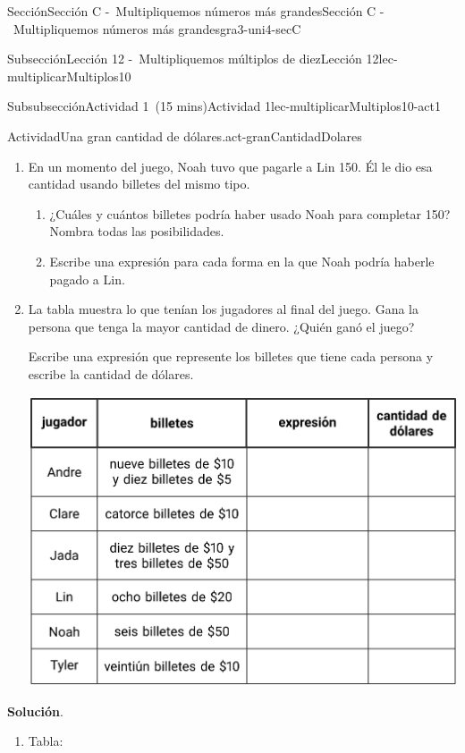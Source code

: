 \documentclass[oneside,10pt,]{article}
\newcommand{\blocktitlefont}{\relax}
\begin{document}
\begin{sectionptx}{Sección}{Sección C -~Multipliquemos números más grandes}{}{Sección C -~Multipliquemos números más grandes}{}{}{gra3-uni4-secC}
\begin{subsectionptx}{Subsección}{Lección 12 -~Multipliquemos múltiplos de diez}{}{Lección 12}{}{}{lec-multiplicarMultiplos10}
\begin{subsubsectionptx}{Subsubsección}{Actividad 1~(15 mins)}{}{Actividad 1}{}{}{lec-multiplicarMultiplos10-act1}
\begin{activity}{Actividad}{Una gran cantidad de dólares.}{act-granCantidadDolares}
\begin{enumerate}
\begin{image}{0}{1}{0}{}
\end{image}%
\item{}En un momento del juego, Noah tuvo que pagarle a Lin \textdollar{}150. Él le dio esa cantidad usando billetes del mismo tipo.%
%
\begin{enumerate}
\item{}¿Cuáles y cuántos billetes podría haber usado Noah para completar \textdollar{}150? Nombra todas las posibilidades.%
\item{}Escribe una expresión para cada forma en la que Noah podría haberle pagado a Lin.%
\end{enumerate}
\item{}La tabla muestra lo que tenían los jugadores al final del juego. Gana la persona que tenga la mayor cantidad de dinero. ¿Quién ganó el juego?%
\par
Escribe una expresión que represente los billetes que tiene cada persona y escribe la cantidad de dólares.%
\begin{image}{0}{1}{0}{}%
\includegraphics[width=\linewidth]{external/tikz-source/unaGranCantidadDeDolares-tab2.pdf}
\end{image}%
\end{enumerate}
\par\smallskip%
\noindent\textbf{\blocktitlefont Solución}.\hypertarget{act-granCantidadDolares-3}{}\quad{}%
\begin{enumerate}
\item{}Tabla:%
\begin{image}{0}{1}{0}{}%

\end{image}
\end{enumerate}
\end{activity}
\end{subsubsectionptx}
\end{subsectionptx}
\end{sectionptx}
\end{document}
